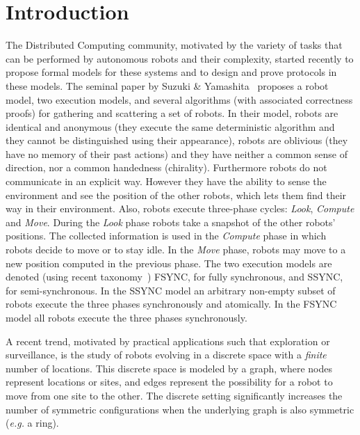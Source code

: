 \documentclass[envcountsame]{llncs} \usepackage[english]{babel}
\begin{document}
\section{Introduction}
\label{sec:in}
The Distributed Computing community, motivated by the variety of tasks that can be performed by autonomous robots and their complexity, started recently to propose formal models for these systems and to design and prove protocols in these models. The seminal paper by Suzuki \& Yamashita~\cite{suzuki_distributed_1996} proposes a robot model, two execution models, and several algorithms (with associated correctness proofs) for gathering and scattering a set of robots. In their model, robots are identical and anonymous (they execute the same deterministic algorithm and they cannot be distinguished using their appearance), robots are oblivious (they have no memory of their past actions) and they have neither a common sense of direction, nor a common handedness (chirality). Furthermore robots do not communicate in an explicit way. However they have the ability to sense the environment and see the position of the other robots, which lets  them find their way in their environment. Also, robots execute three-phase cycles: \textit{Look}, \textit{Compute} and \textit{Move}. During the \textit{Look} phase robots take a snapshot of the other robots' positions. The collected information is used in the \textit{Compute} phase in which robots decide to move or to stay idle. In the \textit{Move} phase, robots may move to a new position computed in the previous phase. The two execution models are denoted (using recent taxonomy~\cite{FPS12b}) FSYNC, for fully synchronous, and SSYNC, for semi-synchronous. In the SSYNC model an arbitrary non-empty subset of robots execute the three phases synchronously and atomically. In the FSYNC model all robots execute the three phases synchronously. 
 
A recent trend, motivated by practical applications such that exploration or surveillance, is the study of robots evolving  in a discrete space with a \textit{finite} number of locations. This discrete space is modeled by a graph, where nodes represent locations or sites, and edges represent the possibility for a robot to move from one site to the other. The discrete setting significantly increases the number of symmetric configurations when the underlying graph is also symmetric (\emph{e.g.} a ring). 
\end{document}
